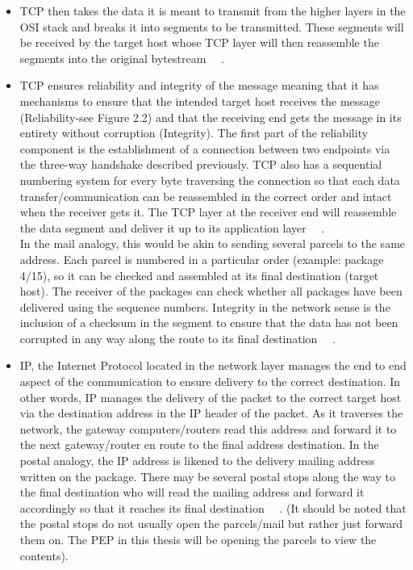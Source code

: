 \begin{itemize}
\item TCP then takes the data it is meant to transmit from the higher layers in the OSI stack and breaks it into segments to be transmitted. These segments will be received by the target host whose TCP layer will then reassemble the segments into the original bytestream ~\cite{1}~\cite{2}. \\

\item TCP ensures reliability and integrity of the message meaning that it has mechanisms to ensure that the intended target host receives the message (Reliability-see Figure 2.2) and that the receiving end gets the message in its entirety without corruption (Integrity). The first part of the reliability component is the establishment of a connection between two endpoints via the three-way handshake described previously. TCP also has a sequential numbering system for every byte traversing the connection so that each data transfer/communication can be reassembled in the correct order and intact when the receiver gets it. The TCP layer at the receiver end will reassemble the data segment and deliver it up to its application layer ~\cite{1}~\cite{2}.\\

In the mail analogy, this would be akin to sending several parcels to the same address. Each parcel is numbered in a particular order (example: package 4/15), so it can be checked and assembled at its final destination (target host). The receiver of the packages can check whether all packages have been delivered using the sequence numbers. Integrity in the network sense is the inclusion of a checksum in the segment to ensure that the data has not been corrupted in any way along the route to its final destination ~\cite{1}~\cite{2}.  \\

\item IP, the Internet Protocol located in the network layer manages the end to end aspect of the communication to ensure delivery to the correct destination. In other words, IP manages the delivery of the packet to the correct target host via the destination address in the IP header of the packet. As it traverses the network, the gateway computers/routers read this address and forward it to the next gateway/router en route to the final address destination. In the postal analogy, the IP address is likened to the delivery mailing address written on the package. There may be several postal stops along the way to the final destination who will read the mailing address and forward it accordingly so that it reaches its final destination ~\cite{1}~\cite{2}. (It should be noted that the postal stops do not usually open the parcels/mail but rather just forward them on. The PEP in this thesis will be opening the parcels to view the contents). \\



\end{itemize}
